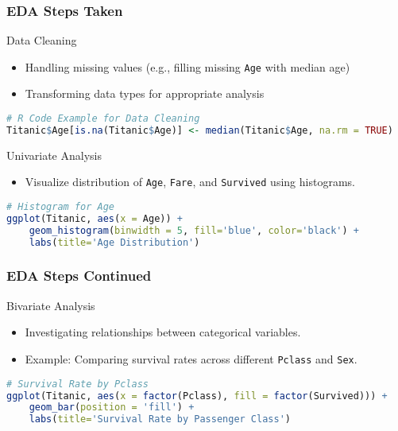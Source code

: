 \documentclass[aspectratio=169]{beamer}
\begin{document}
\begin{frame}[fragile]
    \frametitle{EDA Steps Taken}
    \begin{block}{Data Cleaning}
        \begin{itemize}
            \item Handling missing values (e.g., filling missing \texttt{Age} with median age)
            \item Transforming data types for appropriate analysis
        \end{itemize}
        \begin{lstlisting}[language=R]
# R Code Example for Data Cleaning
Titanic$Age[is.na(Titanic$Age)] <- median(Titanic$Age, na.rm = TRUE)
        \end{lstlisting}
    \end{block}

    \begin{block}{Univariate Analysis}
        \begin{itemize}
            \item Visualize distribution of \texttt{Age}, \texttt{Fare}, and \texttt{Survived} using histograms.
        \end{itemize}
        \begin{lstlisting}[language=R]
# Histogram for Age
ggplot(Titanic, aes(x = Age)) + 
    geom_histogram(binwidth = 5, fill='blue', color='black') + 
    labs(title='Age Distribution')
        \end{lstlisting}
    \end{block}
\end{frame}

\begin{frame}[fragile]
    \frametitle{EDA Steps Continued}
    \begin{block}{Bivariate Analysis}
        \begin{itemize}
            \item Investigating relationships between categorical variables.
            \item Example: Comparing survival rates across different \texttt{Pclass} and \texttt{Sex}.
        \end{itemize}
        \begin{lstlisting}[language=R]
# Survival Rate by Pclass
ggplot(Titanic, aes(x = factor(Pclass), fill = factor(Survived))) + 
    geom_bar(position = 'fill') + 
    labs(title='Survival Rate by Passenger Class')
        \end{lstlisting}
    \end{block}
\end{frame}
\end{document}
